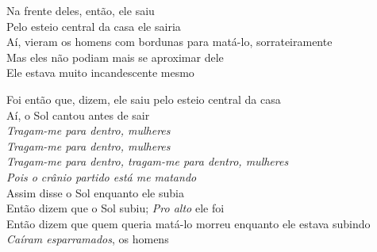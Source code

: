 \smallskip
\begin{center}\end{center}
\smallskip

\noindent Na frente deles, então, ele saiu\\
Pelo esteio central da casa ele sairia\\
Aí, vieram os homens com bordunas para matá-lo, sorrateiramente\\
Mas eles não podiam mais se aproximar dele\\
Ele estava muito incandescente mesmo

\smallskip
\begin{center}\end{center}
\smallskip

\noindent Foi então que, dizem, ele saiu pelo esteio central da casa\\
Aí, o Sol cantou antes de sair\\
\textit{Tragam-me para dentro, mulheres}\\
\textit{Tragam-me para dentro, mulheres}\\
\textit{Tragam-me para dentro, tragam-me para dentro, mulheres}\\
\textit{Pois o crânio partido está me matando}\\
Assim disse o Sol enquanto ele subia\\
Então dizem que o Sol subiu; \textit{Pro alto} ele foi\\
Então dizem que quem queria matá-lo morreu enquanto ele estava subindo\\
\textit{Caíram esparramados}, os homens


